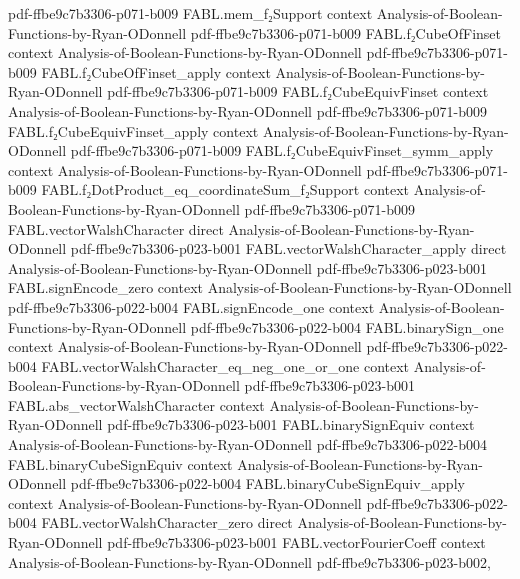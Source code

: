 \begin{theorem}
  {pdf-ffbe9c7b3306-p071-b009}
\proofstep
  {FABL.mem_f₂Support}
  {context}
  {Analysis-of-Boolean-Functions-by-Ryan-ODonnell}
  {pdf-ffbe9c7b3306-p071-b009}
\proofstep
  {FABL.f₂CubeOfFinset}
  {context}
  {Analysis-of-Boolean-Functions-by-Ryan-ODonnell}
  {pdf-ffbe9c7b3306-p071-b009}
\proofstep
  {FABL.f₂CubeOfFinset_apply}
  {context}
  {Analysis-of-Boolean-Functions-by-Ryan-ODonnell}
  {pdf-ffbe9c7b3306-p071-b009}
\proofstep
  {FABL.f₂CubeEquivFinset}
  {context}
  {Analysis-of-Boolean-Functions-by-Ryan-ODonnell}
  {pdf-ffbe9c7b3306-p071-b009}
\proofstep
  {FABL.f₂CubeEquivFinset_apply}
  {context}
  {Analysis-of-Boolean-Functions-by-Ryan-ODonnell}
  {pdf-ffbe9c7b3306-p071-b009}
\proofstep
  {FABL.f₂CubeEquivFinset_symm_apply}
  {context}
  {Analysis-of-Boolean-Functions-by-Ryan-ODonnell}
  {pdf-ffbe9c7b3306-p071-b009}
\proofstep
  {FABL.f₂DotProduct_eq_coordinateSum_f₂Support}
  {context}
  {Analysis-of-Boolean-Functions-by-Ryan-ODonnell}
  {pdf-ffbe9c7b3306-p071-b009}
\proofstep
  {FABL.vectorWalshCharacter}
  {direct}
  {Analysis-of-Boolean-Functions-by-Ryan-ODonnell}
  {pdf-ffbe9c7b3306-p023-b001}
\proofstep
  {FABL.vectorWalshCharacter_apply}
  {direct}
  {Analysis-of-Boolean-Functions-by-Ryan-ODonnell}
  {pdf-ffbe9c7b3306-p023-b001}
\proofstep
  {FABL.signEncode_zero}
  {context}
  {Analysis-of-Boolean-Functions-by-Ryan-ODonnell}
  {pdf-ffbe9c7b3306-p022-b004}
\proofstep
  {FABL.signEncode_one}
  {context}
  {Analysis-of-Boolean-Functions-by-Ryan-ODonnell}
  {pdf-ffbe9c7b3306-p022-b004}
\proofstep
  {FABL.binarySign_one}
  {context}
  {Analysis-of-Boolean-Functions-by-Ryan-ODonnell}
  {pdf-ffbe9c7b3306-p022-b004}
\proofstep
  {FABL.vectorWalshCharacter_eq_neg_one_or_one}
  {context}
  {Analysis-of-Boolean-Functions-by-Ryan-ODonnell}
  {pdf-ffbe9c7b3306-p023-b001}
\proofstep
  {FABL.abs_vectorWalshCharacter}
  {context}
  {Analysis-of-Boolean-Functions-by-Ryan-ODonnell}
  {pdf-ffbe9c7b3306-p023-b001}
\proofstep
  {FABL.binarySignEquiv}
  {context}
  {Analysis-of-Boolean-Functions-by-Ryan-ODonnell}
  {pdf-ffbe9c7b3306-p022-b004}
\proofstep
  {FABL.binaryCubeSignEquiv}
  {context}
  {Analysis-of-Boolean-Functions-by-Ryan-ODonnell}
  {pdf-ffbe9c7b3306-p022-b004}
\proofstep
  {FABL.binaryCubeSignEquiv_apply}
  {context}
  {Analysis-of-Boolean-Functions-by-Ryan-ODonnell}
  {pdf-ffbe9c7b3306-p022-b004}
\proofstep
  {FABL.vectorWalshCharacter_zero}
  {direct}
  {Analysis-of-Boolean-Functions-by-Ryan-ODonnell}
  {pdf-ffbe9c7b3306-p023-b001}
\proofstep
  {FABL.vectorFourierCoeff}
  {context}
  {Analysis-of-Boolean-Functions-by-Ryan-ODonnell}
  {pdf-ffbe9c7b3306-p023-b002,
}
\end{theorem}
